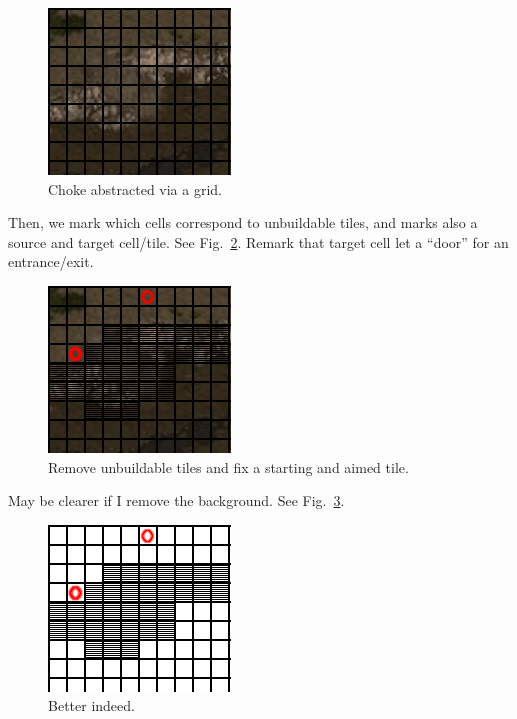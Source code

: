 \documentclass[a4paper,11pt]{article}
\begin{document}
\begin{figure}[!ht]
  \centering
  \includegraphics[width=.4\linewidth]{figs/choke_grid}
  \caption{Choke abstracted via a grid.}
  \label{figs:choke_grid}
\end{figure}

Then, we mark  which cells correspond to unbuildable  tiles, and marks
also      a      source       and      target      cell/tile.      See
Fig.~\ref{figs:choke_grid_marked}.  Remark  that  target  cell  let  a
``door'' for an entrance/exit.

\begin{figure}[!ht]
  \centering
  \includegraphics[width=.4\linewidth]{figs/choke_grid_marked}
  \caption{Remove unbuildable tiles and fix a starting and aimed tile.}
  \label{figs:choke_grid_marked}
\end{figure}

May be clearer if I remove the background. See Fig.~\ref{figs:grid}.

\begin{figure}[!ht]
  \centering
  \includegraphics[width=.4\linewidth]{figs/grid}
  \caption{Better indeed.}
  \label{figs:grid}
\end{figure}
\end{document}
